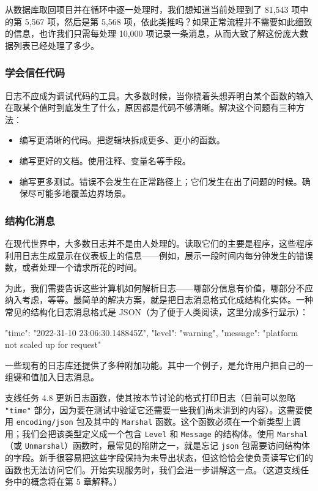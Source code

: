 从数据库取回项目并在循环中逐一处理时，我们想知道当前处理到了 81,543 项中的第 5,567 项，然后是第 5,568 项，依此类推吗？如果正常流程并不需要如此细致的信息，也许我们只需每处理 10,000 项记录一条消息，从而大致了解这份庞大数据列表已经处理了多少。

\subsubsection*{学会信任代码}

日志不应成为调试代码的工具。大多数时候，当你挠着头想弄明白某个函数的输入在取某个值时到底发生了什么，原因都是代码不够清晰。解决这个问题有三种方法：

\begin{itemize}
  \item 编写更清晰的代码。把逻辑块拆成更多、更小的函数。
  \item 编写更好的文档。使用注释、变量名等手段。
  \item 编写更多测试。错误不会发生在正常路径上；它们发生在出了问题的时候。确保尽可能多地覆盖边界场景。
\end{itemize}

\subsubsection*{结构化消息}

在现代世界中，大多数日志并不是由人处理的。读取它们的主要是程序，这些程序利用日志生成显示在仪表板上的信息——例如，展示一段时间内每分钟发生的错误数，或者处理一个请求所花的时间。

为此，我们需要告诉这些计算机如何解析日志——哪部分信息有价值，哪部分不应纳入考虑，等等。最简单的解决方案，就是把日志消息格式化成结构化实体。一种常见的结构化日志消息格式是 JSON（为了便于人类阅读，这里分成多行显示）：

\begin{gocode}[]
{
    "time": "2022-31-10 23:06:30.148845Z",
    "level": "warning",
    "message": "platform not scaled up for request"
}
\end{gocode}

一些现有的日志库还提供了多种附加功能。其中一个例子，是允许用户把自己的一组键和值加入日志消息。

\begin{infobox}{支线任务 4.8}
更新日志函数，使其按本节讨论的格式打印日志（目前可以忽略 \texttt{"time"} 部分，因为要在测试中验证它还需要一些我们尚未讲到的内容）。这需要使用 \texttt{encoding/json} 包及其中的 \texttt{Marshal} 函数。这个函数必须在一个新类型上调用；我们会把该类型定义成一个包含 \texttt{Level} 和 \texttt{Message} 的结构体。使用 \texttt{Marshal}（或 \texttt{Unmarshal}）函数时，最常见的陷阱之一，就是忘记 \texttt{json} 包需要访问结构体的字段。新手很容易把这些字段保持为未导出状态，但这恰恰会使负责读写它们的函数也无法访问它们。开始实现服务时，我们会进一步讲解这一点。（这道支线任务中的概念将在第 5 章解释。）
\end{infobox}

